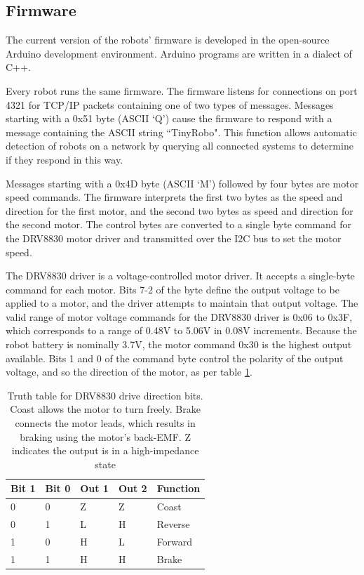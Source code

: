 \subsection {Firmware}

The current version of the robots' firmware is developed in the open-source Arduino development environment.
Arduino programs are written in a dialect of C++. 

Every robot runs the same firmware. 
The firmware listens for connections on port 4321 for TCP/IP packets containing one of two types of messages. 
Messages starting with a 0x51 byte (ASCII `Q') cause the firmware to respond with a message containing the ASCII string ``TinyRobo". 
This function allows automatic detection of robots on a network by querying all connected systems to determine if they respond in this way. 

Messages starting with a 0x4D byte (ASCII `M') followed by four bytes are motor speed commands.
The firmware interprets the first two bytes as the speed and direction for the first motor, and the second two bytes as speed and direction for the second motor.
The control bytes are converted to a single byte command for the DRV8830 motor driver and transmitted over the I2C bus to set the motor speed.

The DRV8830 driver is a voltage-controlled motor driver. 
It accepts a single-byte command for each motor. 
Bits 7-2 of the byte define the output voltage to be applied to a motor, and the driver attempts to maintain that output voltage.
The valid range of motor voltage commands for the DRV8830 driver is 0x06 to 0x3F, which corresponds to a range of 0.48V to 5.06V in 0.08V increments. 
Because the robot battery is nominally 3.7V, the motor command 0x30 is the highest output available. 
Bits 1 and 0 of the command byte control the polarity of the output voltage, and so the direction of the motor, as per table \ref{tab:DRV8830_truth}.

\begin{table}
	\begin{tabular}{l l l l l}
		Bit 1 & Bit 0 & Out 1 & Out 2 & Function\\
		\hline
		0 & 0 & Z & Z & Coast\\
		0 & 1 & L & H & Reverse\\
		1 & 0 & H & L & Forward\\
		1 & 1 & H & H & Brake\\				
	\end{tabular}
	
	\caption{Truth table for DRV8830 drive direction bits. Coast allows the motor to turn freely. Brake connects the motor leads, which results in braking using the motor's back-EMF. Z indicates the output is in a high-impedance state}
	\label{tab:DRV8830_truth}
\end{table}

